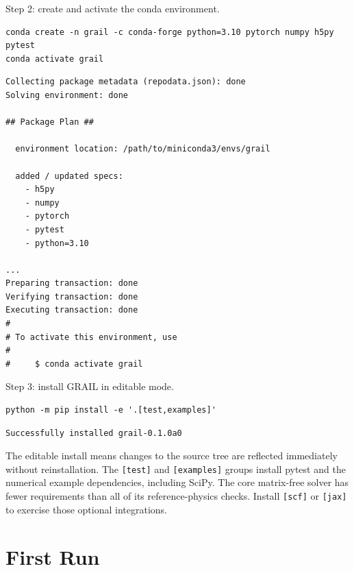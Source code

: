 \medskip
\noindent Step 2: create and activate the conda environment.

\begin{lstlisting}[style=grailInStyle]
conda create -n grail -c conda-forge python=3.10 pytorch numpy h5py pytest
conda activate grail
\end{lstlisting}

\begin{lstlisting}[style=grailOutStyle]
Collecting package metadata (repodata.json): done
Solving environment: done

## Package Plan ##

  environment location: /path/to/miniconda3/envs/grail

  added / updated specs:
    - h5py
    - numpy
    - pytorch
    - pytest
    - python=3.10

...
Preparing transaction: done
Verifying transaction: done
Executing transaction: done
#
# To activate this environment, use
#
#     $ conda activate grail
\end{lstlisting}

\medskip
\noindent Step 3: install GRAIL in editable mode.

\begin{lstlisting}[style=grailInStyle]
python -m pip install -e '.[test,examples]'
\end{lstlisting}

\begin{lstlisting}[style=grailOutStyle]
Successfully installed grail-0.1.0a0
\end{lstlisting}

\noindent The editable install means changes to the source tree are reflected
immediately without reinstallation.
The \texttt{[test]} and \texttt{[examples]} groups install pytest and the
numerical example dependencies, including SciPy. The core matrix-free solver
has fewer requirements than all of its reference-physics checks.
Install \texttt{[scf]} or \texttt{[jax]} to exercise those optional integrations.

\section{First Run}
\label{sec:first-run}

